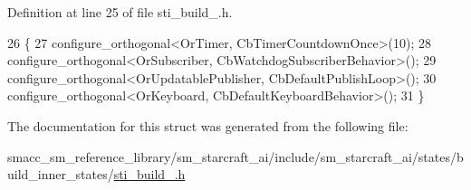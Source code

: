 Definition at line 25 of file sti\+\_\+build\+\_.\+h.


\begin{DoxyCode}
26   \{
27     configure\_orthogonal<OrTimer, CbTimerCountdownOnce>(10);
28     configure\_orthogonal<OrSubscriber, CbWatchdogSubscriberBehavior>();
29     configure\_orthogonal<OrUpdatablePublisher, CbDefaultPublishLoop>();
30     configure\_orthogonal<OrKeyboard, CbDefaultKeyboardBehavior>();
31   \}
\end{DoxyCode}


The documentation for this struct was generated from the following file\+:\begin{DoxyCompactItemize}
\item 
smacc\+\_\+sm\+\_\+reference\+\_\+library/sm\+\_\+starcraft\+\_\+ai/include/sm\+\_\+starcraft\+\_\+ai/states/build\+\_\+inner\+\_\+states/\hyperlink{sti__build__2_8h}{sti\+\_\+build\+\_.\+h}\end{DoxyCompactItemize}
